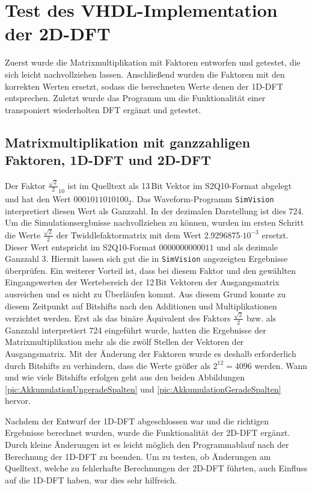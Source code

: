 \section{Test des VHDL-Implementation der 2D-DFT}
Zuerst wurde die Matrixmultiplikation mit Faktoren entworfen und getestet, die sich leicht nachvollziehen lassen. Anschließend wurden die Faktoren 
mit den korrekten Werten ersetzt, sodass die berechneten Werte denen der 1D-DFT entsprechen. Zuletzt wurde das Programm um die Funktionalität 
einer transponiert wiederholten DFT ergänzt und getestet.

\subsection{Matrixmultiplikation mit ganzzahligen Faktoren, 1D-DFT und 2D-DFT}
Der Faktor $\frac{\sqrt{2}}{2}_{10}$ ist im Quelltext als 13\,Bit Vektor im S2Q10-Format abgelegt und hat den Wert $0001011010100_2$.
Das Waveform-Programm \texttt{SimVision} interpretiert diesen Wert als Ganzzahl. In der dezimalen Darstellung ist dies 724.
Um die Simulationsergbnisse nachvollziehen zu können, wurden im ersten Schritt die Werte  $\frac{\sqrt{2}}{2}$ der 
Twiddlefaktormatrix mit dem Wert \num{2.9296875}$\cdot10^{-3}$ ersetzt. Dieser Wert entspricht im S2Q10-Format $0000000000011$ und als
dezimale Ganzzahl 3. Hiermit lassen sich gut die in \texttt{SimVision} angezeigten Ergebnisse überprüfen.
Ein weiterer Vorteil ist, dass bei diesem Faktor und den gewählten Eingangswerten der Wertebereich der 12\,Bit Vektoren der Ausgangsmatrix ausreichen und es nicht zu Überläufen kommt.
Aus diesem Grund konnte zu diesem Zeitpunkt auf Bitshifts nach den Additionen und Multiplikationen verzichtet werden.
Erst als das binäre Äquivalent des Faktors $\frac{\sqrt{2}}{2}$ bzw. als Ganzzahl interpretiert 724 eingeführt wurde, hatten die Ergebnisse der Matrixmultiplikation mehr als die zwölf Stellen der Vektoren der Ausgangsmatrix.
Mit der Änderung der Faktoren wurde es deshalb erforderlich durch Bitshifts zu verhindern, dass die Werte größer als $2^{12}=4096$ werden.
Wann und wie viele Bitshifts erfolgen geht aus den beiden Abbildungen \ref{pic:AkkumulationUngeradeSpalten} und \ref{pic:AkkumulationGeradeSpalten} hervor.

Nachdem der Entwurf der 1D-DFT abgeschlossen war und die richtigen Ergebnisse berechnet wurden, wurde die Funktionalität der 2D-DFT ergänzt. 
Durch kleine Änderungen ist es leicht möglich den Programmablauf nach der Berechnung
der 1D-DFT zu beenden. 
Um zu testen, ob Änderungen am Quelltext, welche zu fehlerhafte Berechnungen der 2D-DFT führten, auch Einfluss auf die 1D-DFT haben, war dies sehr hilfreich.

